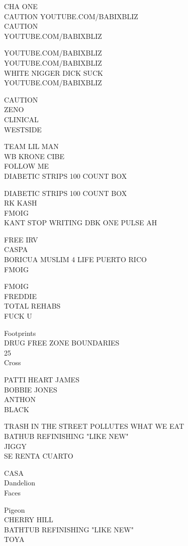 \documentclass[10pt,letterpaper]{article}
\begin{document}
CHA ONE\\
CAUTION YOUTUBE.COM/BABIXBLIZ\\
CAUTION\\
YOUTUBE.COM/BABIXBLIZ

YOUTUBE.COM/BABIXBLIZ\\
YOUTUBE.COM/BABIXBLIZ\\
WHITE NIGGER DICK SUCK\\
YOUTUBE.COM/BABIXBLIZ

CAUTION\\
ZENO\\
CLINICAL\\
WESTSIDE

TEAM LIL MAN\\
WB KRONE CIBE\\
FOLLOW ME\\
DIABETIC STRIPS 100 COUNT BOX

DIABETIC STRIPS 100 COUNT BOX\\
RK KASH\\
FMOIG\\
KANT STOP WRITING DBK ONE PULSE AH

FREE IRV\\
CASPA\\
BORICUA MUSLIM 4 LIFE PUERTO RICO\\
FMOIG

FMOIG\\
FREDDIE\\
TOTAL REHABS\\
FUCK U

Footprints\\
DRUG FREE ZONE BOUNDARIES\\
25\\
Cross

PATTI HEART JAMES\\
BOBBIE JONES\\
ANTHON\\
BLACK

TRASH IN THE STREET POLLUTES WHAT WE EAT\\
BATHUB REFINISHING "LIKE NEW"\\
JIGGY\\
SE RENTA CUARTO

CASA\\
Dandelion\\
Faces

Pigeon\\
CHERRY HILL\\
BATHTUB REFINISHING "LIKE NEW"\\
TOYA
\end{document}
